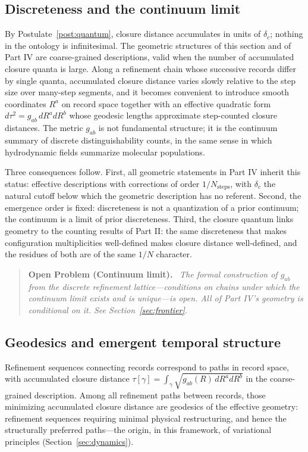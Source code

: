 \documentclass[11pt]{article}
\theoremstyle{definition}
\theoremstyle{remark}
\newenvironment{openproblem}[1]{\begin{quote}\small\textbf{Open Problem (#1).}\ \itshape}{\end{quote}}
\begin{document}
\subsection{Discreteness and the continuum limit}
By Postulate~\ref{post:quantum}, closure distance accumulates in units of $\delta_c$; nothing in the ontology is infinitesimal. The geometric structures of this section and of Part IV are coarse-grained descriptions, valid when the number of accumulated closure quanta is large. Along a refinement chain whose successive records differ by single quanta, accumulated closure distance varies slowly relative to the step size over many-step segments, and it becomes convenient to introduce smooth coordinates $R^a$ on record space together with an effective quadratic form $d\tau^2 = g_{ab}\,dR^a dR^b$ whose geodesic lengths approximate step-counted closure distances. The metric $g_{ab}$ is not fundamental structure; it is the continuum summary of discrete distinguishability counts, in the same sense in which hydrodynamic fields summarize molecular populations.

Three consequences follow. First, all geometric statements in Part IV inherit this status: effective descriptions with corrections of order $1/N_{\mathrm{steps}}$, with $\delta_c$ the natural cutoff below which the geometric description has no referent. Second, the emergence order is fixed: discreteness is not a quantization of a prior continuum; the continuum is a limit of prior discreteness. Third, the closure quantum links geometry to the counting results of Part II: the same discreteness that makes configuration multiplicities well-defined makes closure distance well-defined, and the residues of both are of the same $1/N$ character.

\begin{openproblem}{Continuum limit}
The formal construction of $g_{ab}$ from the discrete refinement lattice---conditions on chains under which the continuum limit exists and is unique---is open. All of Part IV's geometry is conditional on it. See Section~\ref{sec:frontier}.
\end{openproblem}

\subsection{Geodesics and emergent temporal structure}
Refinement sequences connecting records correspond to paths in record space, with accumulated closure distance $\tau[\gamma] = \int_\gamma \sqrt{g_{ab}(R)\, dR^a dR^b}$ in the coarse-grained description. Among all refinement paths between records, those minimizing accumulated closure distance are geodesics of the effective geometry: refinement sequences requiring minimal physical restructuring, and hence the structurally preferred paths---the origin, in this framework, of variational principles (Section~\ref{sec:dynamics}).
\end{document}
